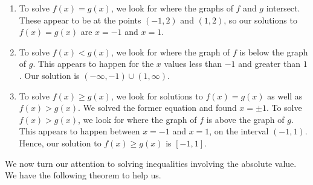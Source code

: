 {
\begin{enumerate}

\item To solve $f(x)=g(x)$, we look for where the graphs of $f$ and $g$ intersect.  These appear to be at the points $(-1,2)$ and $(1,2)$, so our solutions to $f(x) = g(x)$ are $x = -1$ and $x=1$.

\item  To solve $f(x) < g(x)$, we look for where the graph of $f$ is below the graph of $g$.  This appears to happen for the $x$ values less than $-1$ and greater than $1$.  Our solution is $(-\infty, -1) \cup (1,\infty)$.

\item  To solve $f(x) \geq g(x)$, we look for solutions to $f(x)=g(x)$ as well as $f(x) > g(x)$.  We solved the former equation and found $x = \pm 1$.  To solve $f(x) > g(x)$, we look for where the graph of $f$ is above the graph of $g$.  This appears to happen between $x=-1$ and $x=1$, on the interval $(-1,1)$. Hence, our solution to $f(x) \geq g(x)$ is $[-1,1]$. 




\end{enumerate}
}

\medskip

We now turn our attention to solving inequalities involving the absolute value. We have the following theorem to help us.

